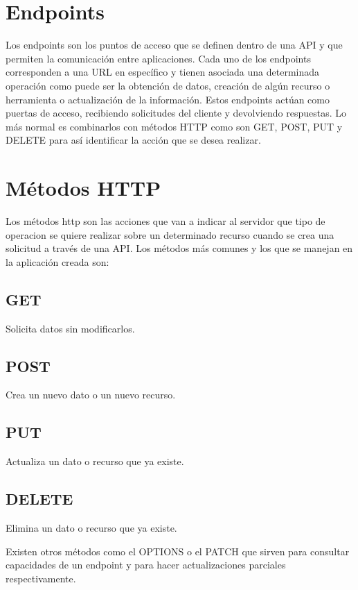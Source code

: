\section{Endpoints}
Los endpoints son los puntos de acceso que se definen dentro de una API y que permiten la comunicación entre aplicaciones. Cada uno de los endpoints corresponden a una URL en específico y tienen asociada una determinada operación como puede ser la obtención de datos, creación de algún recurso o herramienta o actualización de la información. Estos endpoints actúan como puertas de acceso, recibiendo solicitudes del cliente y devolviendo respuestas. Lo más normal es combinarlos con métodos HTTP como son GET, POST, PUT y DELETE para así identificar la acción que se desea realizar.


\section{Métodos HTTP}
Los métodos http son las acciones que van a indicar al servidor que tipo de operacion se quiere realizar sobre un determinado recurso cuando se crea una solicitud a través de una API. Los métodos más comunes y los que se manejan en la aplicación creada son:
\subsection{GET}
Solicita datos sin modificarlos.

\subsection{POST}
Crea un nuevo dato o un nuevo recurso.

\subsection{PUT}
Actualiza un dato o recurso que ya existe.

\subsection{DELETE}
Elimina un dato o recurso que ya existe.

Existen otros métodos como el OPTIONS o el PATCH que sirven para consultar capacidades de un endpoint
y para hacer actualizaciones parciales respectivamente.